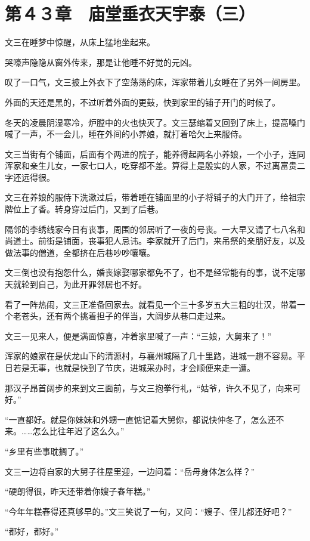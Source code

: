 \section{第４３章　庙堂垂衣天宇泰（三）}

文三在睡梦中惊醒，从床上猛地坐起来。

哭嚎声隐隐从窗外传来，那是让他睡不好觉的元凶。

叹了一口气，文三披上外衣下了空荡荡的床，浑家带着儿女睡在了另外一间房里。

外面的天还是黑的，不过听着外面的更鼓，快到家里的铺子开门的时候了。

冬天的凌晨阴湿寒冷，炉膛中的火也快灭了。文三瑟缩着又回到了床上，提高嗓门喊了一声，不一会儿，睡在外间的小养娘，就打着哈欠上来服侍。

文三当街有个铺面，后面有个两进的院子，能养得起两名小养娘，一个小子，连同浑家和亲生儿女，一家七口人，吃穿都不差。算得上是殷实的人家，不过离富贵二字还远得很。

文三在养娘的服侍下洗漱过后，带着睡在铺面里的小子将铺子的大门开了，给祖宗牌位上了香。转身穿过后门，又到了后巷。

隔邻的李绣线家今日有丧事，周围的邻居听了一夜的号丧。一大早又请了七八名和尚道士。前街是铺面，丧事犯人忌讳。李家就开了后门，来吊祭的亲朋好友，以及做法事的僧道，全都挤在后巷吵吵嚷嚷。

文三倒也没有抱怨什么，婚丧嫁娶哪家都免不了，也不是经常能有的事，说不定哪天就轮到自己，为此开罪邻居也不好。

看了一阵热闹，文三正准备回家去。就看见一个三十多岁五大三粗的壮汉，带着一个老苍头，还有两个挑着担子的伴当，大阔步从巷口走过来。

文三一见来人，便是满面惊喜，冲着家里喊了一声：“三娘，大舅来了！”

浑家的娘家在是伏龙山下的清源村，与襄州城隔了几十里路，进城一趟不容易。平日若是无事，也就是快到了节庆，进城采办时，才会顺便来走一遭。

那汉子昂首阔步的来到文三面前，与文三抱拳行礼，“姑爷，许久不见了，向来可好。”

“一直都好。就是你妹妹和外甥一直惦记着大舅你，都说快仲冬了，怎么还不来。……怎么比往年迟了这么久。”

“乡里有些事耽搁了。”

文三一边将自家的大舅子往屋里迎，一边问着：“岳母身体怎么样？”

“硬朗得很，昨天还带着你嫂子舂年糕。”

“今年年糕舂得还真够早的。”文三笑说了一句，又问：“嫂子、侄儿都还好吧？”

“都好，都好。”

